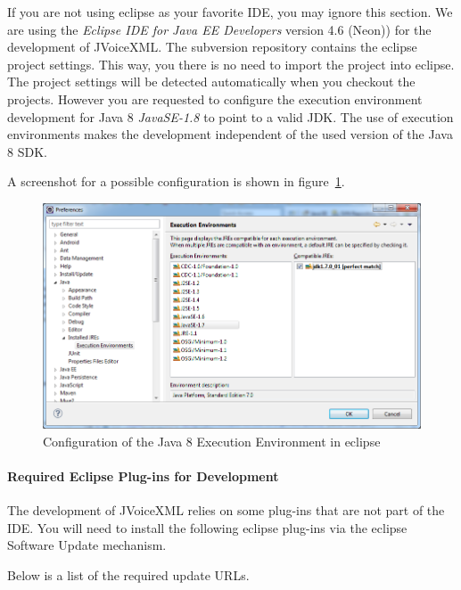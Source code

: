 \documentclass[11pt,a4paper]{article}
\begin{document}
If you are not using eclipse as your favorite IDE, you may ignore this section.
We are using the \emph{Eclipse IDE for Java EE Developers} version 4.6 (Neon))
for the development of JVoiceXML. The subversion repository contains the eclipse
project settings. This way, you there is no need to import the
project into eclipse. The project settings will be detected 
automatically when you checkout the projects. However you are requested to configure the execution
environment development for Java 8 \emph{JavaSE-1.8} to point to a valid JDK.
The use of execution environments makes the development independent of the
used version of the Java 8 SDK.

A screenshot for a possible configuration is shown in
figure~\ref{fig:eclipse-execution-environments}.
\begin{figure}
\includegraphics[width=\linewidth]{eclipse-execution-environments}
\caption{Configuration of the Java 8 Execution Environment in eclipse}
\label{fig:eclipse-execution-environments}
\end{figure}

\paragraph{Required Eclipse Plug-ins for Development}

The development of JVoiceXML relies on some plug-ins that are not part of the
IDE. You will need to install the following eclipse plug-ins via the eclipse
Software Update mechanism.

Below is a list of the required update URLs.
\end{document}
